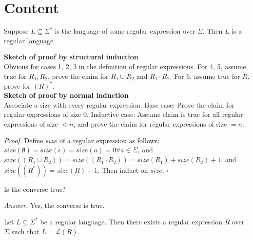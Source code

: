 \documentclass[a4paper]{article}
\newenvironment{proof}{\begin{breakbox}\textit{Proof.}}{\hfill$\square$\end{breakbox}}
\newenvironment{ans}{\begin{breakbox}\textit{Answer.}}{\end{breakbox}}
\newcommand{\mc}{\mathcal}
\renewcommand{\L}{\mc{L}}
\begin{document}
\section{Content}

\begin{theorem}
    Suppose $L \subseteq \Sigma^*$ is the language of some regular expression over $\Sigma$. Then $L$ is a regular language.
\end{theorem}

\begin{note}
    \textbf{Sketch of proof by structural induction}\\

    Obvious for cases 1, 2, 3 in the definition of regular expressions. For 4, 5, assume true for $R_1, R_2$, prove the claim for $R_1 \cup R_2$ and $R_1 \cdot R_2$. For 6, assume true for $R$, prove
    for $(R)^*$.\\

    \textbf{Sketch of proof by normal induction}\\

    Associate a size with every regular expression.
    Base case: Prove the claim for regular expressions of size 0.
    Inductive case: Assume claim is true for all regular expressions of size $< n$, and prove the claim for regular expressions of size $= n$.\\
\end{note}

\begin{proof}
    Define $\mathit{size}$ of a regular expression as follows:
    $\mathit{size}(\emptyset) = \mathit{size}(\epsilon) = \mathit{size}(a) = 0 \forall a \in \Sigma$, and $\mathit{size}((R_1 \cup R_2)) = \mathit{size}((R_1 \cdot R_2)) =
    \mathit{size}(R_1) + \mathit{size}(R_2) + 1$, and $\mathit{size}((R^*)) = \mathit{size}(R) + 1$.
    Then induct on $\mathit{size}$.
\end{proof}

\begin{ques}
    Is the converse true?
\end{ques}

\begin{ans}
    Yes, the converse is true.
\end{ans}

\begin{theorem}
    Let $L \subseteq \Sigma^*$ be a regular language. Then there exists a regular expression $R$ over $\Sigma$ such that $L = \L(R)$.
\end{theorem}
\end{document}
